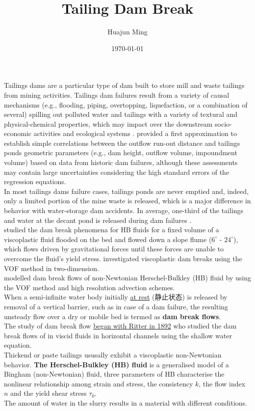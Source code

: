\documentclass[12pt, a4paper]{article}
\title{\textbf{Tailing Dam Break}}
\author{Huajun Ming}
\date{\today}
\begin{document}
    \linenumbers
    \maketitle

    Tailings dams are a particular type of dam built to store mill and waste tailings from mining activities. Tailings dam failures result from a variety of causal mechanisms (e.g., flooding, piping, overtopping, liquefaction, or a combination of several) spilling out polluted water and tailings with a variety of textural and physical-chemical properties, which may impact over the downstream socio-economic activities and ecological systems \citep{Rico2008JHM}. \citet{Rico2008JHM} provided a first approximation to establish simple correlations between the outflow run-out distance and tailings ponds geometric parameters (e.g., dam height, outflow volume, impoundment volume) based on data from historic dam failures, although these assessments may contain large uncertainties considering the high standard errors of the regression equations. \\
    \indent In most tailings dams failure cases, tailings ponds are never emptied and, indeed, only a limited portion of the mine waste is released, which is a major difference in behavior with water-storage dam accidents. In average, one-third of the tailings and water at the decant pond is released during dam failures \citep{Rico2008JHM}. \\
    \indent \citet{Ancey2009JNFM,Ancey2012AWR} studied the dam break phenomena for HB fluids for a fixed volume of a viscoplastic fluid flooded on the bed and flowed down a slope flume ($6^{\circ}$ - $24^{\circ}$), which flows driven by gravitational forces until these forces are unable to overcome the fluid's yield stress. \citet{Liu2016JNFM} investigated viscoplastic dam breaks using the VOF method in two-dimension. \\
    \indent \citet{Lakzian2019PCFD} modelled dam break flows of non-Newtonian Herschel-Bulkley (HB) fluid by using the VOF method and high resolution advection schemes. \\
    \indent When a semi-infinite water body initially \uline{at rest} (静止状态) is released by removal of a vertical barrier, such as in case of a dam failure, the resulting unsteady flow over a dry or mobile bed is termed as \textbf{dam break flows}. \\
    \indent The study of dam break flow \uline{began with Ritter in 1892} who studied the dam break flows of in viscid fluids in horizontal channels using the shallow water equation. \\
    \indent Thickend or paste tailings ususally exhibit a viscoplastic non-Newtonian behavior. \textbf{The Herschel-Bulkley (HB) fluid} is a generalised model of a Bingham (non-Newtonian) fluid, three parameters of HB characterise the nonlinear relationship among strain and stress, the consistency $k$, the flow index $n$ and the yield shear stress $\tau_0$. \\
    \indent The amount of water in the slurry results in a material with different conditions.

    


    
    
\end{document}

